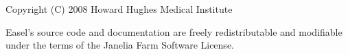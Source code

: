 \vspace*{\fill}
\begin{flushleft}
Copyright (C) 2008 Howard Hughes Medical Institute\\
\end{flushleft}

\vspace{2em} 

Easel's source code and documentation are freely redistributable and
modifiable under the terms of the Janelia Farm Software License.








